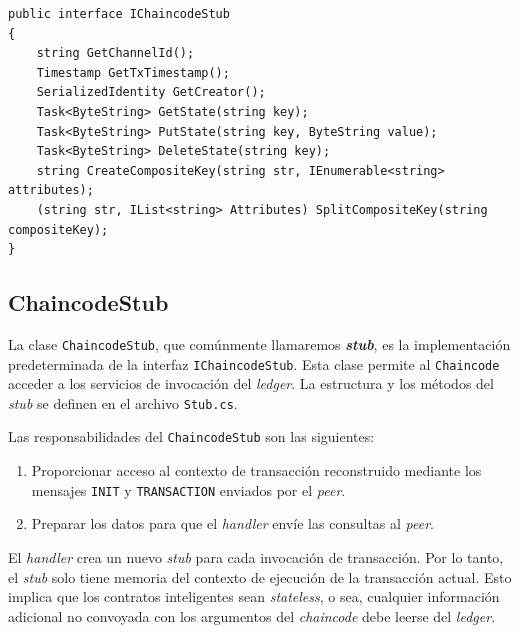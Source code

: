 \begin{lstlisting}[caption={Interfaz \texttt{IChaincodeStub}}, label={code:stub}]
 public interface IChaincodeStub
{
    string GetChannelId();
    Timestamp GetTxTimestamp();
    SerializedIdentity GetCreator();
    Task<ByteString> GetState(string key);
    Task<ByteString> PutState(string key, ByteString value);
    Task<ByteString> DeleteState(string key);
    string CreateCompositeKey(string str, IEnumerable<string> attributes);
    (string str, IList<string> Attributes) SplitCompositeKey(string compositeKey);
}
\end{lstlisting}

\subsection{ChaincodeStub}
La clase \texttt{ChaincodeStub}, que comúnmente llamaremos \textit{\textbf{stub}}, es la implementación predeterminada de la interfaz \texttt{IChaincodeStub}. Esta clase permite al \texttt{Chaincode} acceder a los servicios de invocación del \textit{ledger}. La estructura y los métodos del \textit{stub} se definen en el archivo \texttt{Stub.cs}.

%

Las responsabilidades del \texttt{ChaincodeStub} son las siguientes:

\begin{enumerate}
\item Proporcionar acceso al contexto de transacción reconstruido mediante los mensajes \texttt{INIT} y \texttt{TRANSACTION} enviados por el \textit{peer}.
\item Preparar los datos para que el \textit{handler} envíe las  consultas al \textit{peer}.
\end{enumerate}

El \textit{handler} crea un nuevo \textit{stub} para cada invocación de transacción. Por lo tanto, el \textit{stub} solo tiene memoria del contexto de ejecución de la transacción actual. Esto implica que los contratos inteligentes sean \textit{stateless}, o sea, cualquier información adicional no convoyada con los argumentos del \textit{chaincode} debe leerse del \textit{ledger}.

